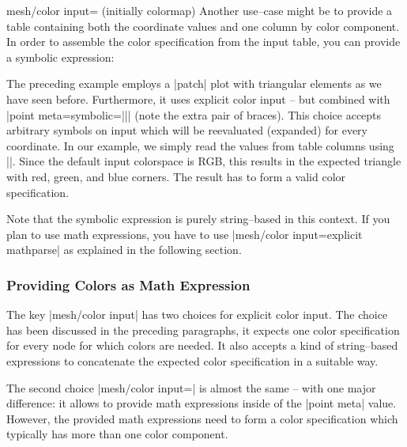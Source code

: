 {{\begin{pgfplotskey}{mesh/color input= (initially colormap)}
Another use--case might be to provide a table containing both the coordinate values and one column by color component. In order to assemble the color specification from the input table, you can provide a symbolic expression:
\begin{codeexample}[]
\end{codeexample}
The preceding example employs a |patch| plot with triangular elements as we have seen before. Furthermore, it uses explicit color input -- but combined with |point meta={symbolic=||}| (note the extra pair of braces). This choice accepts arbitrary symbols on input which will be reevaluated (expanded) for every coordinate. In our example, we simply read the values from table columns using |\thisrow|. Since the default input colorspace is RGB, this results in the expected triangle with red, green, and blue corners. The result has to form a valid color specification.

Note that the symbolic expression is purely string--based in this context. If you plan to use math expressions, you have to use |mesh/color input=explicit mathparse| as explained in the following section.

\subsubsection{Providing Colors as Math Expression}
\label{sec:surf:explicit:color:math}

The key |mesh/color input| has two choices for explicit color input. The choice  has been discussed in the preceding paragraphs, it expects one color specification for every node for which colors are needed. It also accepts a kind of string--based expressions to concatenate the expected color specification in a suitable way.

The second choice |mesh/color input=| is almost the same -- with one major difference: it allows to provide math expressions inside of the |point meta| value. However, the provided math expressions need to form a color specification which typically has more than one color component. 


\end{pgfplotskey}}}
